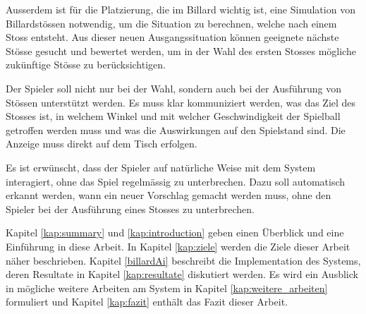 Ausserdem ist für die Platzierung, die im Billard wichtig ist, eine Simulation von Billardstössen notwendig,
um die Situation zu berechnen, welche nach einem Stoss entsteht.
Aus dieser neuen Ausgangssituation können geeignete nächste Stösse gesucht und bewertet werden, um in der Wahl des
ersten Stosses mögliche zukünftige Stösse zu berücksichtigen.

Der Spieler soll nicht nur bei der Wahl, sondern auch bei der Ausführung von Stössen unterstützt werden.
Es muss klar kommuniziert werden, was das Ziel des Stosses ist, in welchem Winkel und mit welcher Geschwindigkeit
der Spielball getroffen werden muss und was die Auswirkungen auf den Spielstand sind.
Die Anzeige muss direkt auf dem Tisch erfolgen.

Es ist erwünscht, dass der Spieler auf natürliche Weise mit dem System interagiert, ohne das Spiel regelmässig zu unterbrechen.
Dazu soll automatisch erkannt werden, wann ein neuer Vorschlag gemacht werden muss, ohne den Spieler bei der Ausführung
eines Stosses zu unterbrechen.

Kapitel \ref{kap:summary} und \ref{kap:introduction} geben einen Überblick und eine Einführung in diese Arbeit.
In Kapitel \ref{kap:ziele} werden die Ziele dieser Arbeit näher beschrieben.
Kapitel \ref{billardAi} beschreibt die Implementation des Systems, deren Resultate in Kapitel \ref{kap:resultate}
diskutiert werden.
Es wird ein Ausblick in mögliche weitere Arbeiten am System in Kapitel \ref{kap:weitere_arbeiten} formuliert und
Kapitel \ref{kap:fazit} enthält das Fazit dieser Arbeit.
